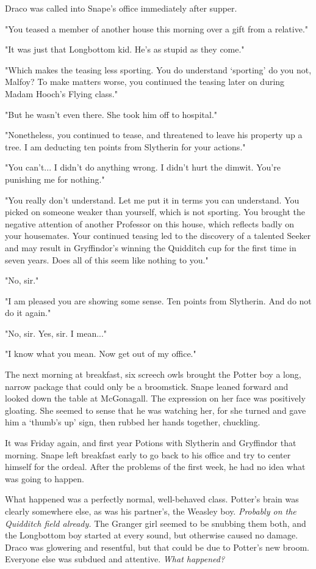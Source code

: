 Draco was called into Snape's office immediately after supper.

"You teased a member of another house this morning over a gift from a relative."

"It was just that Longbottom kid. He's as stupid as they come."

"Which makes the teasing less sporting. You do understand `sporting' do you not, Malfoy? To make matters worse, you continued the teasing later on during Madam Hooch's Flying class."

"But he wasn't even there. She took him off to hospital."

"Nonetheless, you continued to tease, and threatened to leave his property up a tree. I am deducting ten points from Slytherin for your actions."

"You can't... I didn't do anything wrong. I didn't hurt the dimwit. You're punishing me for nothing."

"You really don't understand. Let me put it in terms you can understand. You picked on someone weaker than yourself, which is not sporting. You brought the negative attention of another Professor on this house, which reflects badly on your housemates. Your continued teasing led to the discovery of a talented Seeker and may result in Gryffindor's winning the Quidditch cup for the first time in seven years. Does all of this seem like nothing to you."

"No, sir."

"I am pleased you are showing some sense. Ten points from Slytherin. And do not do it again."

"No, sir. Yes, sir. I mean..."

"I know what you mean. Now get out of my office."

The next morning at breakfast, six screech owls brought the Potter boy a long, narrow package that could only be a broomstick. Snape leaned forward and looked down the table at McGonagall. The expression on her face was positively gloating. She seemed to sense that he was watching her, for she turned and gave him a `thumb's up' sign, then rubbed her hands together, chuckling.

It was Friday again, and first year Potions with Slytherin and Gryffindor that morning. Snape left breakfast early to go back to his office and try to center himself for the ordeal. After the problems of the first week, he had no idea what was going to happen.

What happened was a perfectly normal, well-behaved class. Potter's brain was clearly somewhere else, as was his partner's, the Weasley boy. \emph{Probably on the Quidditch field already.} The Granger girl seemed to be snubbing them both, and the Longbottom boy started at every sound, but otherwise caused no damage. Draco was glowering and resentful, but that could be due to Potter's new broom. Everyone else was subdued and attentive. \emph{What happened?}

